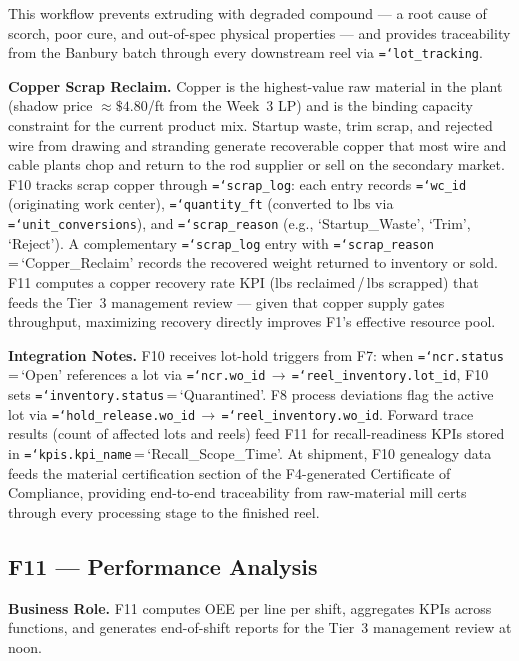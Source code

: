 \documentclass[11pt]{article}
\newcommand{\tfield}[1]{\texttt{\hyphenchar\font=`\-\relax #1}}
\begin{document}
This workflow prevents extruding with degraded compound --- a root cause of scorch, poor cure, and out-of-spec physical properties --- and provides traceability from the Banbury batch through every downstream reel via \tfield{lot\_tracking}.

\textbf{Copper Scrap Reclaim.}
Copper is the highest-value raw material in the plant (shadow price ${\approx}\$4.80$/ft from the Week~3 LP) and is the binding capacity constraint for the current product mix.  Startup waste, trim scrap, and rejected wire from drawing and stranding generate recoverable copper that most wire and cable plants chop and return to the rod supplier or sell on the secondary market.  F10 tracks scrap copper through \tfield{scrap\_log}: each entry records \tfield{wc\_id} (originating work center), \tfield{quantity\_ft} (converted to lbs via \tfield{unit\_conversions}), and \tfield{scrap\_reason} (e.g., `Startup\_Waste', `Trim', `Reject').  A complementary \tfield{scrap\_log} entry with \tfield{scrap\_reason}\,=\,`Copper\_Reclaim' records the recovered weight returned to inventory or sold.  F11 computes a copper recovery rate KPI (lbs reclaimed\,/\,lbs scrapped) that feeds the Tier~3 management review --- given that copper supply gates throughput, maximizing recovery directly improves F1's effective resource pool.

\textbf{Integration Notes.}
F10 receives lot-hold triggers from F7: when \tfield{ncr.status}\,=\,`Open' references a lot via \tfield{ncr.wo\_id}\,$\to$\,\tfield{reel\_inventory.\allowbreak lot\_id}, F10 sets \tfield{inventory.status}\,=\,`Quarantined'.  F8 process deviations flag the active lot via \tfield{hold\_release.\allowbreak wo\_id}\,$\to$\,\tfield{reel\_inventory.wo\_id}.  Forward trace results (count of affected lots and reels) feed F11 for recall-readiness KPIs stored in \tfield{kpis.kpi\_name}\,=\,`Recall\_Scope\_Time'.  At shipment, F10 genealogy data feeds the material certification section of the F4-generated Certificate of Compliance, providing end-to-end traceability from raw-material mill certs through every processing stage to the finished reel.

\subsection{F11 --- Performance Analysis}

\textbf{Business Role.}
F11 computes OEE per line per shift, aggregates KPIs across functions, and generates end-of-shift reports for the Tier~3 management review at noon.
\end{document}
